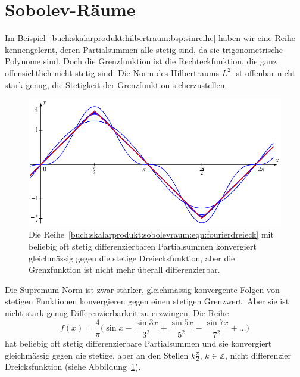 %
%
%
\section{Sobolev-Räume
\label{buch:skalarprodukt:section:sobolev}}
Im Beispiel~\ref{buch:skalarprodukt:hilbertraum:bsp:sinreihe} haben 
wir eine Reihe kennengelernt, deren Partialsummen alle stetig sind,
da sie trigonometrische Polynome sind.
Doch die Grenzfunktion ist die Rechteckfunktion, die ganz offensichtlich
nicht stetig sind.
Die Norm des Hilbertraums $L^2$ ist offenbar nicht stark genug, die
Stetigkeit der Grenzfunktion sicherzustellen.

\begin{figure}
\centering
\includegraphics{chapters/010-skalarprodukt/images/fourierdreieck.pdf}
\caption{Die 
Reihe~\ref{buch:skalarprodukt:sobolevraum:eqn:fourierdreieck}
mit beliebig oft stetig differenzierbaren Partialsummen konvergiert
gleichmässig gegen die stetige Dreiecksfunktion, aber die Grenzfunktion
ist nicht mehr überall differenzierbar.
\label{buch:skalarprodukt:sobolevraum:fig:fourierdreieck}}
\end{figure}
Die Supremum-Norm ist zwar stärker, gleichmässig konvergente Folgen
von stetigen Funktionen konvergieren gegen einen stetigen Grenzwert.
Aber sie ist nicht stark genug Differenzierbarkeit zu erzwingen.
Die Reihe
\begin{equation}
f(x)
=
\frac{4}{\pi}\biggl(
\sin x - \frac{\sin 3x}{3^2} + \frac{\sin 5x}{5^2} -\frac{\sin 7x}{7^2} +\dots
\biggr)
\label{buch:skalarprodukt:sobolevraum:eqn:fourierdreieck}
\end{equation}
hat beliebig oft stetig differenzierbare Partialsummen und sie konvergiert
gleichmässig gegen die stetige, aber an den Stellen $k\frac{\pi}2$,
$k\in\mathbb{Z}$, nicht differenzier Dreicksfunktion (siehe
Abbildung~\ref{buch:skalarprodukt:sobolevraum:fig:fourierdreieck}).

